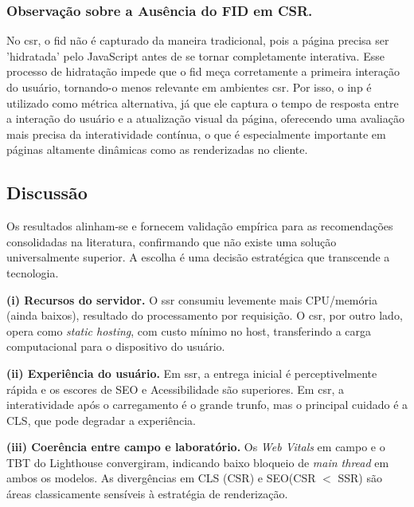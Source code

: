 \subsubsection{Observação sobre a Ausência do FID em CSR.}
No \acrshort{csr}, o \acrfull{fid} não é capturado da maneira tradicional, pois a página precisa ser 'hidratada' pelo JavaScript antes de se tornar completamente interativa. Esse processo de hidratação impede que o \acrshort{fid} meça corretamente a primeira interação do usuário, tornando-o menos relevante em ambientes \acrshort{csr}. Por isso, o \acrfull{inp} é utilizado como métrica alternativa, já que ele captura o tempo de resposta entre a interação do usuário e a atualização visual da página, oferecendo uma avaliação mais precisa da interatividade contínua, o que é especialmente importante em páginas altamente dinâmicas como as renderizadas no cliente.

\subsection{Discussão}
\label{subsec:discussao-comparativa}
Os resultados alinham-se e fornecem validação empírica para as recomendações consolidadas na literatura, confirmando que não existe uma solução universalmente superior. A escolha é uma decisão estratégica que transcende a tecnologia.

\textbf{(i) Recursos do servidor.} O \acrshort{ssr} consumiu levemente mais CPU/memória (ainda baixos), resultado do processamento por requisição. O \acrshort{csr}, por outro lado, opera como \emph{static hosting}, com custo mínimo no host, transferindo a carga computacional para o dispositivo do usuário.

\textbf{(ii) Experiência do usuário.} Em \acrshort{ssr}, a entrega inicial é perceptivelmente rápida e os escores de SEO e Acessibilidade são superiores. Em \acrshort{csr}, a interatividade após o carregamento é o grande trunfo, mas o principal cuidado é a CLS, que pode degradar a experiência.

\textbf{(iii) Coerência entre campo e laboratório.} Os \textit{Web Vitals} em campo e o TBT do Lighthouse convergiram, indicando baixo bloqueio de \emph{main thread} em ambos os modelos. As divergências em CLS (CSR) e SEO(CSR $<$ SSR) são áreas classicamente sensíveis à estratégia de renderização.

